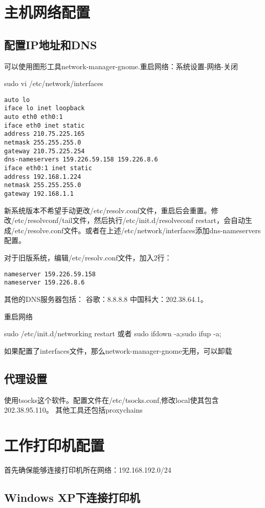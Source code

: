 \section{主机网络配置}
\subsection{配置IP地址和DNS}
可以使用图形工具network-manager-gnome.重启网络：系统设置-网络-关闭
\begin{shellcmd}
sudo vi /etc/network/interfaces 
\end{shellcmd}
\begin{verbatim}
auto lo
iface lo inet loopback
auto eth0 eth0:1
iface eth0 inet static
address 210.75.225.165
netmask 255.255.255.0
gateway 210.75.225.254
dns-nameservers 159.226.59.158 159.226.8.6
iface eth0:1 inet static
address 192.168.1.224
netmask 255.255.255.0
gateway 192.168.1.1
\end{verbatim}

新系统版本不希望手动更改/etc/resolv.conf文件，重启后会重置。修改/etc/resolvconf/tail文件，然后执行/etc/init.d/resolveconf restart，会自动生成/etc/resolve.conf文件。或者在上述/etc/network/interfaces添加dns-nameservers配置。

对于旧版系统，编辑/etc/resolv.conf文件，加入2行： 
\begin{verbatim}
nameserver 159.226.59.158
nameserver 159.226.8.6
\end{verbatim}
其他的DNS服务器包括：
谷歌：8.8.8.8
中国科大：202.38.64.1。


重启网络
\begin{shellcmd}
sudo /etc/init.d/networking restart
或者 sudo ifdown -a;sudo ifup -a;
\end{shellcmd}
如果配置了interfaces文件，那么network-manager-gnome无用，可以卸载

\subsection{代理设置}
使用tsocks这个软件。配置文件在/etc/tsocks.conf,修改local使其包含202.38.95.110。
其他工具还包括proxychains





\section{工作打印机配置}
首先确保能够连接打印机所在网络：192.168.192.0/24

\subsection{Windows XP下连接打印机}

